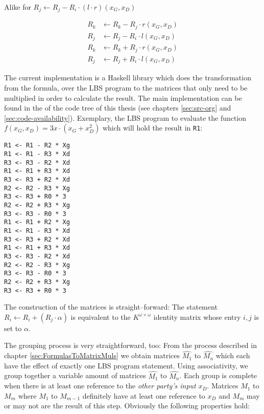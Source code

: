 Alike for $R_j \leftarrow R_j - R_i \cdot (l \cdot r)(x_G, x_D)$

\begin{align*}
R_k & \leftarrow R_k - R_j \cdot r(x_G, x_D) \\
R_j & \leftarrow R_j - R_i \cdot l(x_G, x_D) \\
R_k & \leftarrow R_k + R_j \cdot r(x_G, x_D) \\
R_j & \leftarrow R_j + R_i \cdot l(x_G, x_D)
\end{align*}



The current implementation is a Haskell library which does the transformation
from the formula, over the LBS program to the matrices that only need to be
multiplied in order to calculate the result. The main implementation can be
found in the  of the code tree of this thesis (see
chapters \ref{sec:src-org} and \ref{sec:code-availability}). Exemplary, the
LBS program to evaluate the function $f(x_G,x_D) = 3x \cdot (x_G + x_D^2)$ which
will hold the result in \texttt{R1}:

\begin{lstlisting}
R1 <- R1 - R2 * Xg
R1 <- R1 - R3 * Xd
R3 <- R3 - R2 * Xd
R1 <- R1 + R3 * Xd
R3 <- R3 + R2 * Xd
R2 <- R2 - R3 * Xg
R3 <- R3 + R0 * 3
R2 <- R2 + R3 * Xg
R3 <- R3 - R0 * 3
R1 <- R1 + R2 * Xg
R1 <- R1 - R3 * Xd
R3 <- R3 + R2 * Xd
R1 <- R1 + R3 * Xd
R3 <- R3 - R2 * Xd
R2 <- R2 - R3 * Xg
R3 <- R3 - R0 * 3
R2 <- R2 + R3 * Xg
R3 <- R3 + R0 * 3
\end{lstlisting}

\noindent{}The construction of the matrices is straight--forward: The statement
$R_i \leftarrow R_i + (R_j \cdot \alpha)$ is equivalent to the $K^{\omega \times
\omega}$ identity matrix whose entry $i,j$ is set to $\alpha$.


\label{sec:matrix-grouping}

The grouping process is very straightforward, too: From the process described in
chapter \ref{sec:FormulasToMatrixMuls} we obtain matrices $\widehat{M_1}$ to
$\widehat{M_n}$ which each have the effect of exactly one LBS program statement.
Using associativity, we group together a variable amount of matrices
$\widehat{M_1}$ to $\widehat{M_n}$. Each group is complete when there is at
least one reference to the \emph{other party's input} $x_D$.  Matrices $M_1$ to
$M_m$ where $M_1$ to $M_{m-1}$ definitely have at least one reference to $x_D$
and $M_m$ may or may not are the result of this step.  Obviously the following
properties hold:

